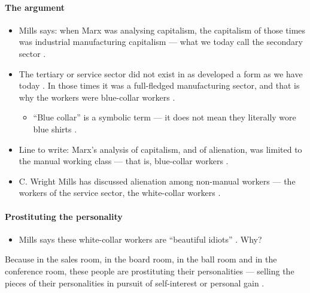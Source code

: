 \paragraph{The argument}
\begin{itemize}
    \item Mills says: when Marx was analysing capitalism, the capitalism of those times was industrial manufacturing capitalism --- what we today call the secondary sector .
    \item The tertiary or service sector did not exist in as developed a form as we have today . In those times it was a full-fledged manufacturing sector, and that is why the workers were blue-collar workers .
    \begin{itemize}
        \item ``Blue collar'' is a symbolic term --- it does not mean they literally wore blue shirts .
    \end{itemize}
    \item Line to write: Marx's analysis of capitalism, and of alienation, was limited to the manual working class --- that is, blue-collar workers .
    \item C. Wright Mills has discussed alienation among non-manual workers --- the workers of the service sector, the white-collar workers .
\end{itemize}

\paragraph{Prostituting the personality}
\begin{itemize}
    \item Mills says these white-collar workers are ``beautiful idiots'' . Why? 
\end{itemize}

\begin{KeyConcept}
Because in the sales room, in the board room, in the ball room and in the conference room, these people are prostituting their personalities --- selling the pieces of their personalities in pursuit of self-interest or personal gain .
\end{KeyConcept}

